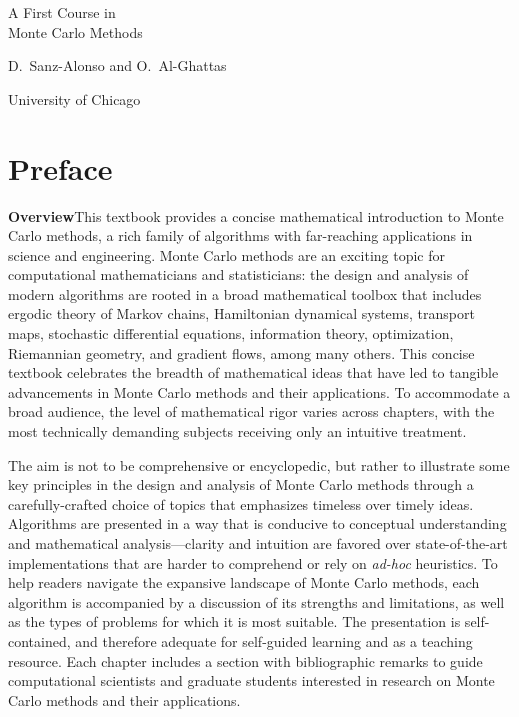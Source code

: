 \begin{titlepage}
\centering
\vspace*{2in}
{\Huge A First Course in\\[0.3em] Monte Carlo Methods\par}
\vspace{1.5em}
{\large D.\ Sanz-Alonso and O.\ Al-Ghattas\par}
\vspace{0.5em}
{\normalsize University of Chicago\par}
\vfill
\end{titlepage}

\frontmatter

\listoffigures
\listofalgorithms
{}

\chapter*{Preface}

\textbf{Overview}\quad This textbook provides a concise mathematical introduction to Monte Carlo
methods, a rich family of algorithms with far-reaching applications in science and engineering.
Monte Carlo methods are an exciting topic for computational mathematicians and statisticians:
the design and analysis of modern algorithms are rooted in a broad mathematical toolbox that
includes ergodic theory of Markov chains, Hamiltonian dynamical systems, transport maps,
stochastic differential equations, information theory, optimization, Riemannian geometry, and
gradient flows, among many others. This concise textbook celebrates the breadth of mathematical
ideas that have led to tangible advancements in Monte Carlo methods and their applications.
To accommodate a broad audience, the level of mathematical rigor varies across chapters, with
the most technically demanding subjects receiving only an intuitive treatment.

The aim is not to be comprehensive or encyclopedic, but rather to illustrate some key principles
in the design and analysis of Monte Carlo methods through a carefully-crafted choice of topics
that emphasizes timeless over timely ideas. Algorithms are presented in a way that is conducive
to conceptual understanding and mathematical analysis---clarity and intuition are favored over
state-of-the-art implementations that are harder to comprehend or rely on \textit{ad-hoc}
heuristics. To help readers navigate the expansive landscape of Monte Carlo methods, each
algorithm is accompanied by a discussion of its strengths and limitations, as well as the types
of problems for which it is most suitable. The presentation is self-contained, and therefore
adequate for self-guided learning and as a teaching resource. Each chapter includes a section
with bibliographic remarks to guide computational scientists and graduate students interested
in research on Monte Carlo methods and their applications.

